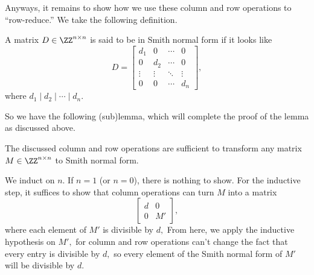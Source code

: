 Anyways, it remains to show how we use these column and row operations to ``row-reduce.'' We take the following definition.
\begin{definition}
    A matrix $D\in\ZZ^{n\times n}$ is said to be in Smith normal form if it looks like
    \[D=\begin{bmatrix}
        d_1 & 0 & \cdots & 0 \\
        0 & d_2 & \cdots & 0 \\
        \vdots & \vdots & \ddots & \vdots \\
        0 & 0 & \cdots & d_n
    \end{bmatrix},\]
    where $d_1\mid d_2\mid\cdots\mid d_n.$
\end{definition}
So we have the following (sub)lemma, which will complete the proof of the lemma as discussed above.
\begin{lemma}
    The discussed column and row operations are sufficient to transform any matrix $M\in\ZZ^{n\times n}$ to Smith normal form.
\end{lemma}
We induct on $n.$ If $n=1$ (or $n=0$), there is nothing to show. For the inductive step, it suffices to show that column operations can turn $M$ into a matrix
\[\begin{bmatrix}
    d & 0 \\
    0 & M'
\end{bmatrix},\]
where each element of $M'$ is divisible by $d,$ From here, we apply the inductive hypothesis on $M',$ for column and row operations can't change the fact that every entry is divisible by $d,$ so every element of the Smith normal form of $M'$ will be divisible by $d.$

